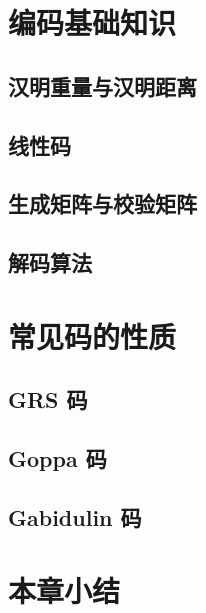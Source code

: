 \section{编码基础知识}

\subsection{汉明重量与汉明距离}

\subsection{线性码}

\subsection{生成矩阵与校验矩阵}

\subsection{解码算法}

\section{常见码的性质}

\subsection{GRS 码}

\subsection{Goppa 码}

\subsection{Gabidulin 码}

\section{本章小结}
